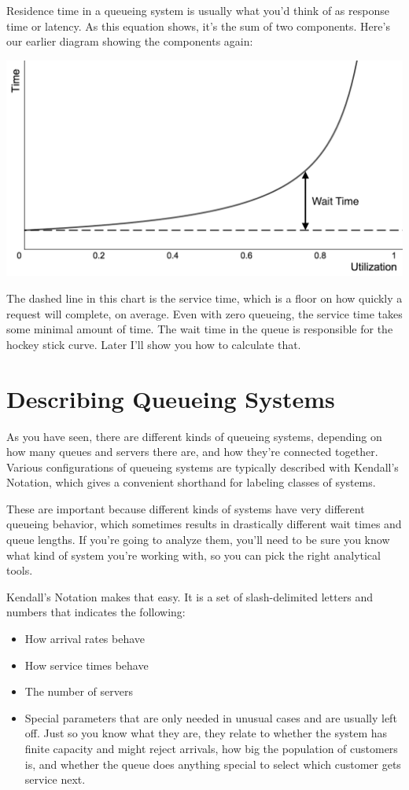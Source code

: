 \documentclass{vivid_layout_pdf}
\begin{document}
Residence time in a queueing system is usually what you'd think of as response time or latency. As this equation shows, it's the sum of two components.  Here's our earlier diagram showing the components again:

\begin{center}
\includegraphics[width=.75\linewidth]{queueing-theory/hockey-stick-1}
\end{center}

The dashed line in this chart is the service time, which is a floor on how quickly a request will complete, on average. Even with zero queueing, the service time takes some minimal amount of time. The wait time in the queue is responsible for the hockey stick curve. Later I'll show you how to calculate that.

\section{Describing Queueing Systems}

As you have seen, there are different kinds of queueing systems, depending on how many queues and servers there are, and how they're connected together. Various configurations of queueing systems are typically described with Kendall's Notation, which gives a convenient shorthand for labeling classes of systems.

These are important because different kinds of systems have very different queueing behavior, which sometimes results in drastically different wait times and queue lengths. If you're going to analyze them, you'll need to be sure you know what kind of system you're working with, so you can pick the right analytical tools.

Kendall's Notation makes that easy. It is a set of slash-delimited letters and numbers that indicates the following:

\begin{itemize}
\item How arrival rates behave
\item How service times behave
\item The number of servers
\item Special parameters that are only needed in unusual cases and are usually left off. Just so you know what they are, they relate to whether the system has finite capacity and might reject arrivals, how big the population of customers is, and whether the queue does anything special to select which customer gets service next.
\end{itemize}
\end{document}

